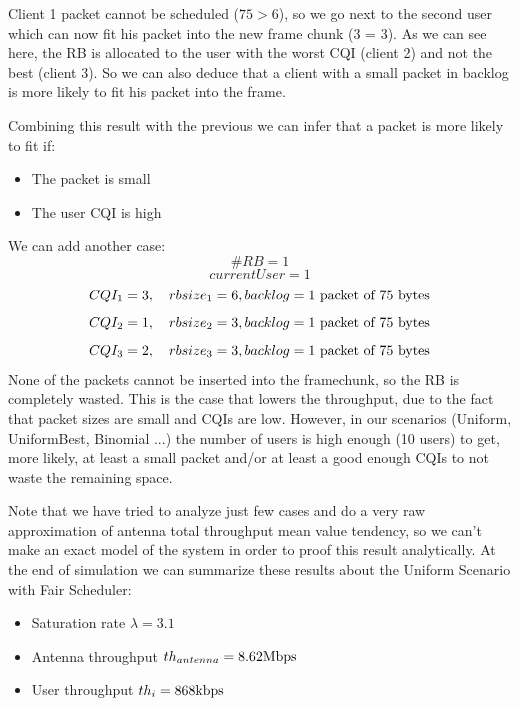 Client 1 packet cannot be scheduled (\(75 > 6\)), so we go next to the second user which can now fit his packet into the new frame chunk (3 = 3). As we can see here, the RB is allocated to the user with the worst CQI (client 2) and not the best (client 3). So we can also deduce that a client with a small packet in backlog is more likely to fit his packet into the frame.

Combining this result with the previous we can infer that a packet is more likely to fit if:
\begin{itemize}
	\item The packet is small
	\item The user CQI is high
\end{itemize}
We can add another case:
\[\#RB = 1\]
\[currentUser = 1\]
\[CQI_1 = 3, \quad rbsize_1 = 6, backlog = \textnormal{1 packet of 75 bytes}\]
\[CQI_2 = 1, \quad rbsize_2 = 3, backlog = \textnormal{1 packet of 75 bytes}\]
\[CQI_3 = 2, \quad rbsize_3 = 3, backlog = \textnormal{1 packet of 75 bytes}\]
None of the packets cannot be inserted into the framechunk, so the RB is completely wasted. This is the case that lowers the throughput, due to the fact that packet sizes are small and CQIs are low. However, in our scenarios (Uniform, UniformBest, Binomial ...) the number of users is high enough (10 users) to get, more likely, at least a small packet and/or at least a good enough CQIs to not waste the remaining space.



Note that we have tried to analyze just few cases and do a very raw approximation of antenna total throughput mean value tendency, so we can't make an exact model of the system in order to proof this result analytically. 
At the end of simulation we can summarize these results about the Uniform Scenario with Fair Scheduler:
\begin{itemize}
	\item Saturation rate \(\lambda = 3.1\)
	\item Antenna throughput \(th_{antenna} = 8.62 \textnormal{Mbps}\)
	\item User throughput \(th_{i} = 868 \textnormal{kbps}\)
\end{itemize} 

